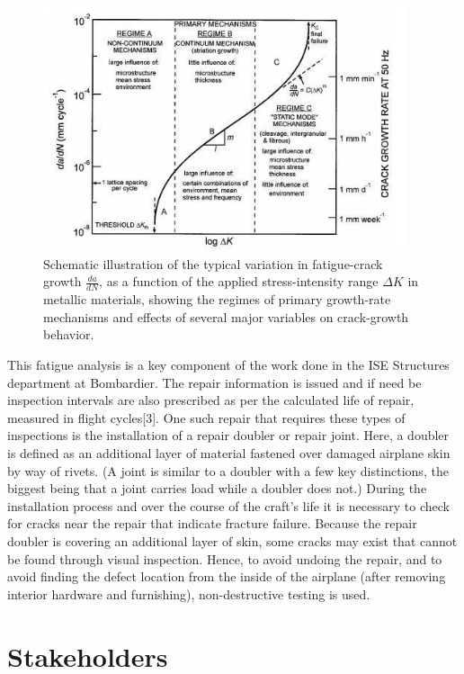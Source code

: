 \documentclass[12pt]{article}
\begin{document}
\begin{figure}[H]
  \centering
  	\includegraphics[width=0.95\textwidth]{image3}
  \caption{Schematic illustration of the typical variation in fatigue-crack growth $\frac{da}{dN}$, as a function of the applied stress-intensity range $\Delta K$ in metallic materials, showing the regimes of primary growth-rate mechanisms and effects of several major variables on crack-growth behavior.}
  \label{fig:fig3}
\end{figure}

This fatigue analysis is a key component of the work done in the ISE Structures department at Bombardier. The repair information is issued and if need be inspection intervals are also prescribed as per the calculated life of repair, measured in flight cycles[3]. One such repair that requires these types of inspections is the installation of a repair doubler or repair joint. Here, a doubler is defined as an additional layer of material fastened over damaged airplane skin by way of rivets. (A joint is similar to a doubler with a few key distinctions, the biggest being that a joint carries load while a doubler does not.) During the installation process and over the course of the craft's life it is necessary to check for cracks near the repair that indicate fracture failure. Because the repair doubler is covering an additional layer of skin, some cracks may exist that cannot be found through visual inspection. Hence, to avoid undoing the repair, and to avoid finding the defect location from the inside of the airplane (after removing interior hardware and furnishing), non-destructive testing is used.
\newpage
\section{Stakeholders}
\end{document}
